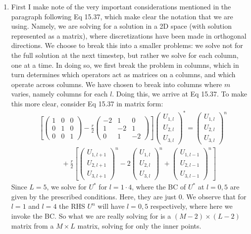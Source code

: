 \documentclass[11pt]{article}
\def\f{\frac }
\begin{document}
\begin{enumerate}
\item First I make note of the very important considerations mentioned in the paragraph following Eq 15.37, which make clear the notation that we are using.
Namely, we are solving for a solution in a 2D space (with solution represented as a matrix), where discretizations have been made in orthogonal directions.
We choose to break this into a smaller problems: we solve not for the full solution at the next timestep, but rather we solve for each column, one at a time.
In doing so, we first break the problem in columns, which in turn determines which operators act as matrices on a columns, and which operate across columns.
We have chosen to break into columns where $m$ varies, namely columns for each $l$.
Doing this, we arrive at Eq 15.37.
To make this more clear, consider Eq 15.37 in matrix form:
\begin{align*} & \left [ \left ( \begin{array}{ccc} 1 & 0 & 0\\ 0 & 1 & 0\\ 0 & 0 & 1 \end{array} \right )  - \f{r}{2} \left ( \begin{array}{ccc} -2 & 1 & 0\\ 1 & -2 & 1\\ 0 & 1 & -2 \end{array} \right )\right ] \left ( \begin{array}{c} U_{1,l} \\ U_{2,l} \\ U_{3,l} \end{array} \right ) ^{*} = \left ( \begin{array}{c} U_{1,l} \\ U_{2,l} \\ U_{3,l} \end{array} \right ) ^{n} \\
&~~~~~~~~~~~~~~~+ \f{r}{2} \left [ \left ( \begin{array}{c} U_{1,l+1} \\ U_{2,l+1} \\ U_{3,l+1} \end{array} \right ) ^{n} - 2\left ( \begin{array}{c} U_{1,l} \\ U_{2,l} \\ U_{3,l} \end{array} \right ) ^{n} + \left ( \begin{array}{c} U_{1,l-1} \\ U_{2,l-1} \\ U_{3,l-1} \end{array} \right ) ^{n}\right ] \end{align*}
Since $L = 5$, we solve for $U^{*}$ for $l = 1\cdot 4$, where the BC of $U^{*}$ at $l = 0, 5$ are given by the prescribed conditions.
Here, they are just 0.
We observe that for $l=1$ and $l=4$ the RHS $U^{n}$ will have $l=0,5$ respectively, where here we invoke the BC.
So what we are really solving for is a $(M-2) \times (L-2)$ matrix from a $M\times L$ matrix, solving for only the inner points.


\end{enumerate}
\end{document}
